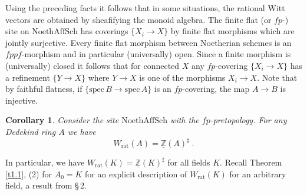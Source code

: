 \documentclass[12pt,leqno]{article}
\newcommand{\Z}{{\mathbb{Z}}}
\newcommand{\uZ}{\underline{\Z}}
\newcommand{\NAS}{\mathrm{NoethAffSch}}
\newcommand{\spec}{\mathrm{spec}\,}
\newcommand{\rat}{\mathrm{rat}}
\newtheorem{cor}[theorem]{Corollary}
\newenvironment{rem}{\noindent {\bf Remark}}{}
\begin{document}
Using the preceding facts it follows that in some situations, the rational Witt vectors are obtained by sheafifying the monoid algebra. The finite flat (or $fp$-) site on $\NAS$ has coverings $\{ X_i \to X \}$ by finite flat morphisms which are jointly surjective. Every finite flat morphism between Noetherian schemes is an $fppf$-morphism and in particular (universally) open. Since a finite morphism is (universally) closed it follows that for connected $X$ any $fp$-covering $\{ X_i \to X \}$ has a refinement $\{ Y \to X \}$ where $Y \to X$ is one of the morphisms $X_i \to X$. Note that by faithful flatness, if $\{ \spec B \to \spec A \}$ is an $fp$-covering, the map $A \to B$ is injective. 

\begin{cor}
\label{t4.6}
Consider the site $\NAS$ with the $fp$-pretopology. For any Dedekind ring $A$ we have
\[
W_{\rat} (A) = \uZ (A)^{\sharp} \; .
\]
\end{cor}

\begin{rem}
In particular, we have $W_{\rat} (K) = \uZ (K)^{\sharp}$ for all fields $K$. Recall Theorem \ref{t1.1}, (2) for $A_0 = K$ for an explicit description of $W_{\rat} (K)$ for an arbitrary field, a result from \cite{BV} \S\,2.
\end{rem}
\end{document}
